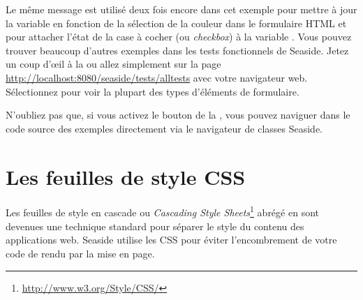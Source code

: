 \documentclass[a4paper,10pt,twoside]{book}
\begin{document}
Le même message est utilisé deux fois encore dans cet exemple pour
mettre à jour la variable  en fonction de la sélection de la
couleur dans le formulaire HTML et pour attacher l'état de la case à
cocher (ou \emph{checkbox}) à la variable .
Vous pouvez trouver beaucoup d'autres exemples dans les tests
fonctionnels de Seaside.
Jetez un coup d'\oe{}il à la  %
ou allez simplement sur la page
\url{http://localhost:8080/seaside/tests/alltests} avec votre
navigateur web.
Sélectionnez  
 pour voir la plupart des types d'éléments de formulaire.

N'oubliez pas que, si vous activez le bouton  de
la \toolbar, vous pouvez naviguer dans le code source des exemples
directement via le navigateur de classes Seaside. 

\section{Les feuilles de style CSS}


Les feuilles de style en cascade ou 
\emph{Cascading Style
  Sheets}\footnote{\url{http://www.w3.org/Style/CSS/}} abrégé en
  sont devenues une technique standard pour séparer le style
 du contenu des applications web.
Seaside utilise les CSS pour éviter l'encombrement de votre code de
rendu par la mise en page.
\end{document}

